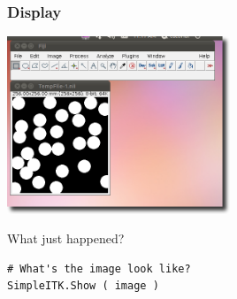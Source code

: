 \begin{frame}[fragile]
\frametitle{Display}
\begin{center}
  \includegraphics[width=0.5\textwidth]{Images/ImageDisplay_shadow}
\end{center}

What just happened?
\lstpython
\begin{lstlisting}
# What's the image look like?
SimpleITK.Show ( image )
\end{lstlisting}
\end{frame}

